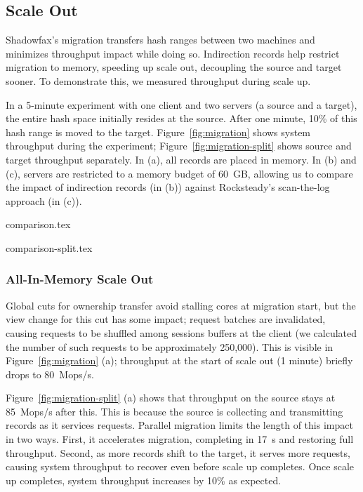 \subsection{Scale Out}
\label{sec:eval:migration}

Shadowfax's migration transfers hash ranges between
two machines and minimizes throughput impact while doing so.
%
Indirection records help restrict migration to memory, speeding up
scale out, decoupling the source and target sooner.
%
To demonstrate this, we measured throughput during scale up.

In a 5-minute experiment with one client and two servers (a source and a
target), the entire hash space initially resides at the source.
%
After one minute, 10\% of this hash range is moved to the target.
%
Figure~\ref{fig:migration} shows system throughput during
the experiment; Figure~\ref{fig:migration-split}
shows source and target throughput separately.
%
In (a), all records are placed in memory.
%
In (b) and (c), servers are restricted to a memory budget of 60~GB,
allowing us to compare the impact of indirection records (in (b)) against
Rocksteady's scan-the-log approach (in (c)).

 {comparison.tex}

 {comparison-split.tex}

\subsubsection{All-In-Memory Scale Out}

Global cuts for ownership transfer avoid stalling cores at migration start, but
the view change for this cut has some impact; request batches are invalidated,
causing requests to be shuffled among sessions buffers at the client
(we calculated the number of such requests to be approximately 250,000).
%
This is visible in Figure~\ref{fig:migration} (a); throughput at the
start of scale out (1 minute) briefly drops to 80~Mops/s.

Figure~\ref{fig:migration-split} (a) shows that throughput on the source
stays at 85~Mops/s after this.
%
This is because the source is collecting and transmitting records as it
services requests.
%
Parallel migration limits the length of this impact in two ways.
%
First, it accelerates migration, completing in 17~s and restoring full
throughput.
%
Second, as more records shift to the target, it
serves more requests, causing system throughput to recover
even before scale up completes.
%
Once scale up completes, system throughput increases by 10\% as expected.

